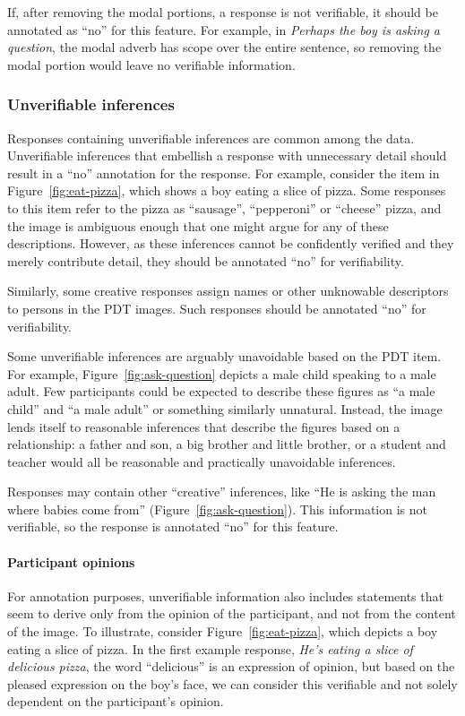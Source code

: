 \documentclass[12pt,notitlepage]{article}
\begin{document}
If, after removing the modal portions, a response is not verifiable, it should be annotated as ``no'' for this feature. For example, in \textit{Perhaps the boy is asking a question}, the modal adverb has scope over the entire sentence, so removing the modal portion would leave no verifiable information.

\subsubsection{Unverifiable inferences} Responses containing unverifiable inferences are common among the data. Unverifiable inferences that embellish a response with unnecessary detail should result in a ``no'' annotation for the response. For example, consider the item in Figure~\ref{fig:eat-pizza}, which shows a boy eating a slice of pizza. Some responses to this item refer to the pizza as ``sausage'', ``pepperoni'' or ``cheese'' pizza, and the image is ambiguous enough that one might argue for any of these descriptions. However, as these inferences cannot be confidently verified and they merely contribute detail, they should be annotated ``no'' for verifiability.

Similarly, some creative responses assign names or other unknowable descriptors to persons in the PDT images. Such responses should be annotated ``no'' for verifiability.

Some unverifiable inferences are arguably unavoidable based on the PDT item. For example, Figure~\ref{fig:ask-question} depicts a male child speaking to a male adult. Few participants could be expected to describe these figures as ``a male child'' and ``a male adult'' or something similarly unnatural. Instead, the image lends itself to reasonable inferences that describe the figures based on a relationship: a father and son, a big brother and little brother, or a student and teacher would all be reasonable and practically unavoidable inferences. 


Responses may contain other ``creative'' inferences, like ``He is asking the man where babies come from'' (Figure~\ref{fig:ask-question}). This information is not verifiable, so the response is annotated ``no'' for this feature.

\paragraph{Participant opinions} For annotation purposes, unverifiable information also includes statements that seem to derive only from the opinion of the participant, and not from the content of the image. To illustrate, consider Figure~\ref{fig:eat-pizza}, which depicts a boy eating a slice of pizza. In the first example response, \textit{He's eating a slice of delicious pizza}, the word ``delicious'' is an expression of opinion, but based on the pleased expression on the boy's face, we can consider this verifiable and not solely dependent on the participant's opinion.
\end{document}

